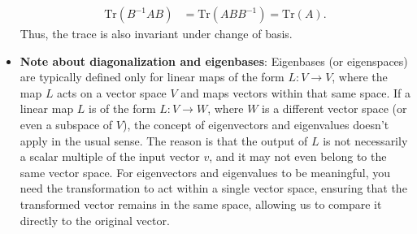 \documentclass{report}
\begin{document}
\begin{itemize}
            \begin{align*}
                \text{Tr}(B^{-1}AB) &= \text{Tr}(ABB^{-1}) = \text{Tr}(A)
            .\end{align*}
            \bigbreak \noindent 
            Thus, the trace is also invariant under change of basis.
        \item \textbf{Note about diagonalization and eigenbases}: Eigenbases (or eigenspaces) are typically defined only for linear maps of the form 
            \( L: V \to V \), where the map \( L \) acts on a vector space \( V \) and maps vectors within that same space. 
            \bigbreak \noindent 
            If a linear map \( L \) is of the form \( L: V \to W \), where \( W \) is a different vector space (or even a subspace of \( V \)), the concept of eigenvectors and eigenvalues doesn’t apply in the usual sense. The reason is that the output of \( L \) is not necessarily a scalar multiple of the input vector \( v \), and it may not even belong to the same vector space.
            \bigbreak \noindent 
            For eigenvectors and eigenvalues to be meaningful, you need the transformation to act within a single vector space, ensuring that the transformed vector remains in the same space, allowing us to compare it directly to the original vector.


\end{itemize}
\end{document}
